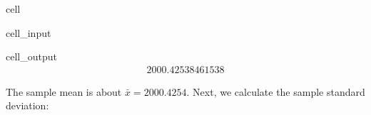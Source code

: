 \documentclass[letterpaper,10pt,english]{jupyterBook}
\begin{document}
\begin{sphinxuseclass}{cell}\begin{sphinxVerbatimInput}

\begin{sphinxuseclass}{cell_input}
\begin{sphinxVerbatim}[commandchars=\\\{\}]

\end{sphinxVerbatim}

\end{sphinxuseclass}\end{sphinxVerbatimInput}
\begin{sphinxVerbatimOutput}

\begin{sphinxuseclass}{cell_output}\begin{equation*}
\begin{split}2000.42538461538\end{split}
\end{equation*}
\end{sphinxuseclass}\end{sphinxVerbatimOutput}

\end{sphinxuseclass}
\sphinxAtStartPar
The sample mean is about \(\bar{x} = 2000.4254\). Next, we calculate the sample standard deviation:
\end{document}
